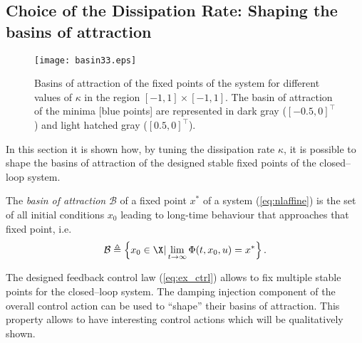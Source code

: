 \subsection{Choice of the Dissipation Rate: Shaping the basins of attraction}
%
\begin{figure*}[h]
	\centering
	\texttt{[image: basin33.eps]}
	\vspace{-9mm}
	\caption{\footnotesize Basins of attraction of the fixed points of the system for different values of $\kappa$ in the region $[-1,1]\times [-1,1]$. The basin of attraction of the minima [blue points] are represented in dark gray ($[-0.5,0]^\top$) and light hatched gray ($[0.5,0]^\top$).}
	\label{fig:basin}
\end{figure*}
%
In this section it is shown how, by tuning the dissipation rate $\kappa$, it is possible to shape the basins of attraction of the designed stable fixed points of the closed--loop system.
%
\begin{defn}
The \textit{basin of attraction} $\mathcal{B}$ of a fixed point $x^*$ of a system (\ref{eq:nlaffine}) is the set of all initial conditions $x_0$ leading to long-time behaviour that approaches that fixed point, i.e.
\begin{equation*}
    \mathcal{B} \triangleq \left\{x_0\in\X|\lim \limits_{t\rightarrow\infty}\Phi(t,x_0,u)=x^*\right\}.
\end{equation*}
\end{defn}
%
The designed feedback control law (\ref{eq:ex_ctrl}) allows to fix multiple stable points for the closed--loop system. The damping injection component of the overall control action can be used to ``shape'' their basins of attraction. This property allows to have interesting control actions which will be qualitatively shown.
%

